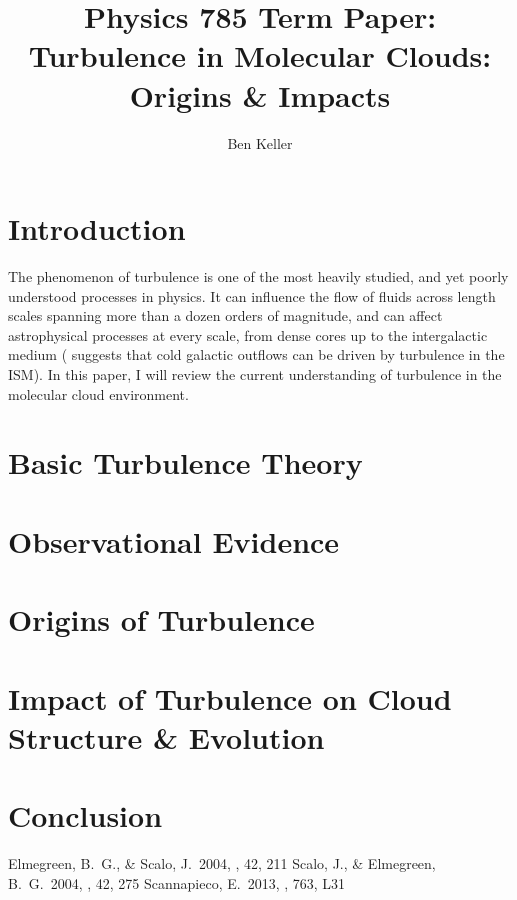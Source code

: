 \documentclass[12pt, preprint]{aastex}
\begin{document}
\title{Physics 785 Term Paper: Turbulence in Molecular Clouds: Origins \&
Impacts}
\author{Ben Keller}
\maketitle
\newpage
\section{Introduction}
The phenomenon of turbulence is one of the most heavily studied, and yet poorly
understood processes in physics.  It can influence the flow of fluids across
length scales spanning more than a dozen orders of magnitude, and can affect
astrophysical processes at every scale, from dense cores up to the intergalactic
medium (\citet{scan2013} suggests that cold galactic outflows can be
driven by turbulence in the ISM).  In this paper, I will review the current understanding of turbulence in
the molecular cloud environment.
\section{Basic Turbulence Theory}
\section{Observational Evidence}
\section{Origins of Turbulence}
\section{Impact of Turbulence on Cloud Structure \& Evolution}
\section{Conclusion}
\begin{thebibliography}{}
	 Elmegreen, B.~G., \& Scalo, J.\
			2004, \araa, 42, 211 
	 Scalo, J., \& Elmegreen, B.~G.\
			2004, \araa, 42, 275
	\bibitem[Scannapieco(2013)]{scan2013} Scannapieco, E.\ 2013, \apjl, 763, L31 
\end{thebibliography}
\end{document}
